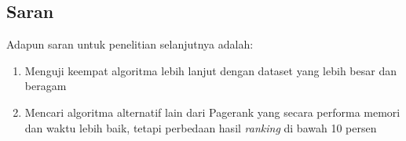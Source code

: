 \documentclass[
	a4paper, %
	12pt, %
	unnumberedsections, %
	twoside, %
]{LTJournalArticle}
\begin{document}
\subsection{Saran}
Adapun saran untuk penelitian selanjutnya adalah:
\begin{enumerate} 
	\item Menguji keempat algoritma lebih lanjut dengan dataset yang lebih besar dan beragam
    \item Mencari algoritma alternatif lain dari Pagerank yang secara performa memori dan waktu lebih baik, tetapi perbedaan hasil \textit{ranking} di bawah 10 persen
\end{enumerate}



\end{document}
